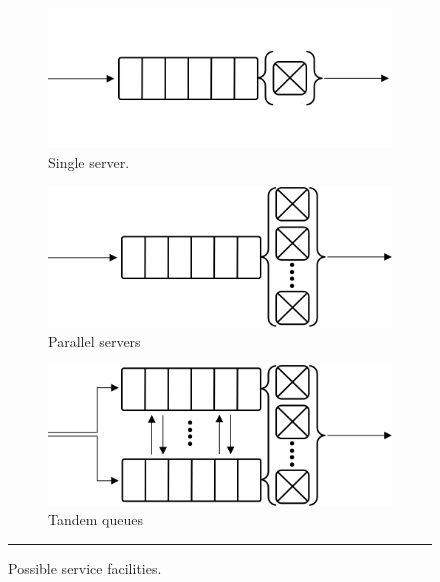 \begin{figure}[t]
\centering
        \begin{subfigure}[c]{0.40\textwidth}
                \centering
                \includegraphics[width=\textwidth]{images/QSD/MM12}
                \caption{\small Single server.} 
        \end{subfigure}\qquad
        \begin{subfigure}[c]{0.40\textwidth}
                \centering
                \includegraphics[width=\textwidth]{images/QSD/MMc}
                \caption{\small Parallel servers} 
        \end{subfigure}
        \begin{subfigure}[c]{0.40\textwidth}
                \centering
                \includegraphics[width=\textwidth]{images/QSD/Tandem}
                \caption{\small Tandem queues} 
        \end{subfigure}\caption{\small Possible service facilities.} \hrule
\label{fig:service_facilities}
\end{figure}
